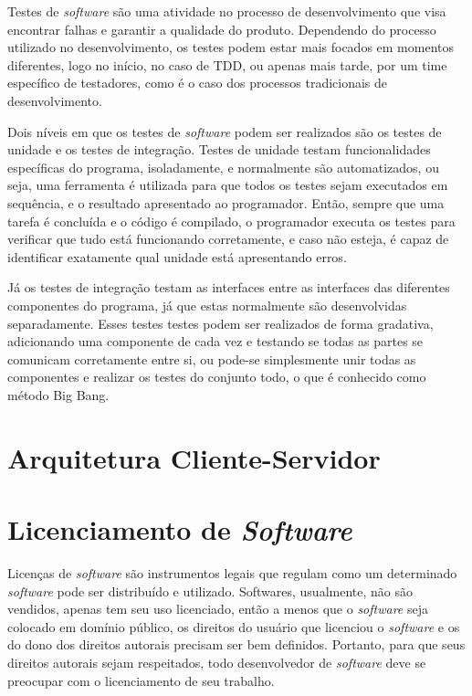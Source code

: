 Testes de \emph{software} são uma atividade no processo de desenvolvimento que visa encontrar falhas e garantir a qualidade do produto. Dependendo do processo utilizado no desenvolvimento, os testes podem estar mais focados em momentos diferentes, logo no início, no caso de TDD, ou apenas mais tarde, por um time específico de testadores, como é o caso dos processos tradicionais de desenvolvimento.

Dois níveis em que os testes de \emph{software} podem ser realizados são os testes de unidade e os testes de integração. Testes de unidade testam funcionalidades específicas do programa, isoladamente, e normalmente são automatizados, ou seja, uma ferramenta é utilizada para que todos os testes sejam executados em sequência, e o resultado apresentado ao programador. Então, sempre que uma tarefa é concluída e o código é compilado, o programador executa os testes para verificar que tudo está funcionando corretamente, e caso não esteja, é capaz de identificar exatamente qual unidade está apresentando erros.

Já os testes de integração testam as interfaces entre as interfaces das diferentes componentes do programa, já que estas normalmente são desenvolvidas separadamente. Esses testes testes podem ser realizados de forma gradativa, adicionando uma componente de cada vez e testando se todas as partes se comunicam corretamente entre si, ou pode-se simplesmente unir todas as componentes e realizar os testes do conjunto todo, o que é conhecido como método Big Bang.

\section{Arquitetura Cliente-Servidor}

\section{Licenciamento de \emph{Software}}

Licenças de \emph{software} são instrumentos legais que regulam como um determinado \emph{software} pode ser distribuído e utilizado.
Softwares, usualmente, não são vendidos, apenas tem seu uso licenciado, então a menos que o \emph{software} seja colocado em domínio público, os direitos do usuário que licenciou o \emph{software} e os do dono dos direitos autorais precisam ser bem definidos. Portanto, para que seus direitos autorais sejam respeitados, todo desenvolvedor de \emph{software} deve se preocupar com o licenciamento de seu trabalho.

